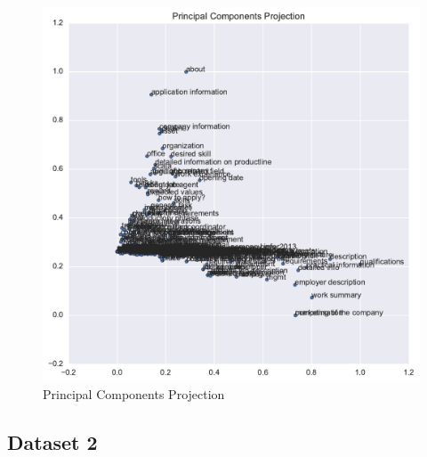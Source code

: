 \begin{figure}[h]
    \centering
    \includegraphics[width=\textwidth]{img/paragraph-data-principal-components-projection.pdf}
    \caption{Principal Components Projection}
\label{fig:paragraph-data-principal-components-projection}
\end{figure}



\subsection{Dataset 2}

